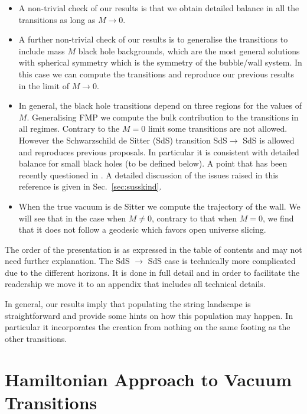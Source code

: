 \documentclass[a4paper,11pt]{article}
\numberwithin{equation}{section}
\numberwithin{equation}{section}
\begin{document}
\begin{itemize}
\item A non-trivial check of our results is that we obtain detailed balance in all the transitions as long as $M\rightarrow 0$.

\item A further non-trivial check of our results is to generalise the transitions to include mass $M$ black hole backgrounds, which are the most general solutions with spherical symmetry which is the symmetry of the bubble/wall system. In this case we can compute the transitions and reproduce our previous results in the limit of $M\rightarrow 0$. 

\item In general, the black hole transitions depend on three regions for the values of $M$. Generalising FMP we compute the bulk contribution to the transitions in all regimes. Contrary to the $M=0$ limit some transitions are not allowed. However the Schwarzschild de Sitter (SdS) transition SdS$\rightarrow$ SdS is allowed and reproduces previous proposals. In particular it is consistent with detailed balance for small black holes (to be defined below). A point that has been recently questioned in \cite{Susskind:2021yvs}. A detailed discussion of the issues raised in this reference is given in Sec.~\ref{sec:susskind}.

\item When the true vacuum is de Sitter we compute the trajectory of the wall.  We will see that in the  case when $M\neq 0$,  contrary to that when $M=0$, we find that it does not follow a geodesic which favors  open universe slicing.

\end{itemize}

The order of the presentation is as expressed in the table of contents and may not need further explanation. The SdS $\rightarrow$ SdS case is technically more complicated due to the different horizons. It is done in full detail and in order to facilitate the readership we move it to an appendix that includes all technical details. 

In general, our results imply that populating  the  string landscape is straightforward and provide some hints on how this population may happen. In particular it incorporates the creation from nothing on the same footing as the other transitions.



\section{Hamiltonian Approach to Vacuum Transitions}
\end{document}
